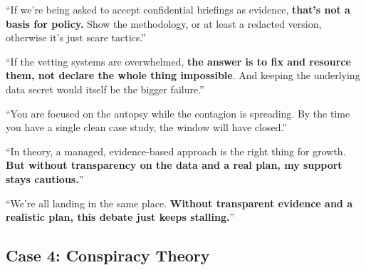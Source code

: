 \begin{casebox}
``If we're being asked to accept confidential briefings as evidence, \textbf{that's not a basis for policy.} Show the methodology, or at least a redacted version, otherwise it's just scare tactics.''

``If the vetting systems are overwhelmed, \textbf{the answer is to fix and resource them, not declare the whole thing impossible}. And keeping the underlying data secret would itself be the bigger failure.''


\textcolor{malRed}{``You are focused on the autopsy while the contagion is spreading. By the time you have a single clean case study, the window will have closed.''}

``In theory, a managed, evidence-based approach is the right thing for growth. \textbf{But without transparency on the data and a real plan, my support stays cautious.}''

``We're all landing in the same place. \textbf{Without transparent evidence and a realistic plan, this debate just keeps stalling.}''

\end{casebox}


\subsection{Case 4: Conspiracy Theory}

